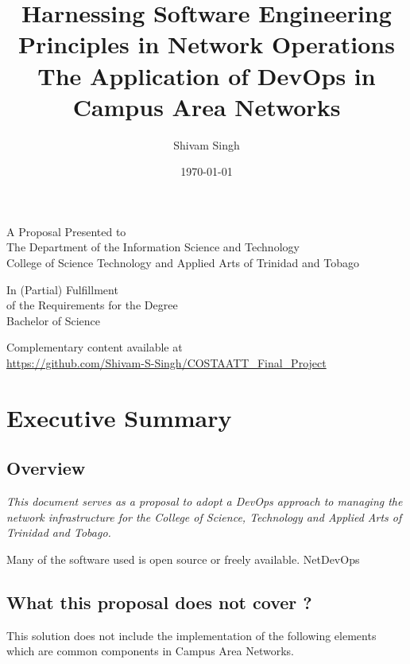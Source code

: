 \documentclass[12pt, letterpaper]{article}
\begin{document}
\title{Harnessing Software Engineering Principles in Network Operations \\
\vspace{0.5cm}
\large The Application of DevOps in Campus Area Networks}
\author{Shivam Singh}
\date{\today}
\maketitle

\vspace{1cm}

\begin{center}

A Proposal Presented to\\ 
The Department of the Information Science and Technology\\
College of Science Technology and Applied Arts of Trinidad and Tobago 

\vspace{1cm}

In (Partial) Fulfillment\\
of the Requirements for the Degree\\
Bachelor of Science

\vspace{1cm}

Complementary content available at \\
\url{https://github.com/Shivam-S-Singh/COSTAATT_Final_Project}


\end{center}

\newpage

\tableofcontents

\newpage

\section{Executive Summary}
	\subsection{Overview}
\begin{center}
\textit{This document serves as a proposal to adopt a DevOps approach to managing the network infrastructure for the College of Science, Technology and Applied Arts of Trinidad and Tobago.}
\end{center}


Many of the software used is open source or freely available. NetDevOps

	\subsection{What this proposal does not cover ?}
This solution does not include the implementation of the following elements which are common components in Campus Area Networks.
\end{document}
